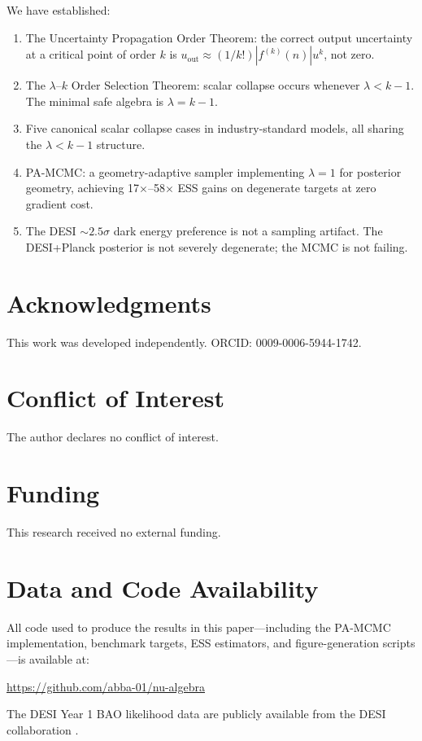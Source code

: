 \documentclass[11pt]{article}
\theoremstyle{definition}
\begin{document}
We have established:
\begin{enumerate}
\item The Uncertainty Propagation Order Theorem: the correct output uncertainty at a
  critical point of order $k$ is $u_{\mathrm{out}} \approx (1/k!)|f^{(k)}(n)|u^k$,
  not zero.
\item The $\lambda$--$k$ Order Selection Theorem: scalar collapse occurs whenever
  $\lambda < k-1$.  The minimal safe algebra is $\lambda = k-1$.
\item Five canonical scalar collapse cases in industry-standard models, all sharing
  the $\lambda < k-1$ structure.
\item PA-MCMC: a geometry-adaptive sampler implementing $\lambda=1$ for posterior
  geometry, achieving 17$\times$--58$\times$ ESS gains on degenerate targets at
  zero gradient cost.
\item The DESI ${\sim}2.5\sigma$ dark energy preference is not a sampling artifact.
  The DESI+Planck posterior is not severely degenerate; the MCMC is not failing.
\end{enumerate}

\section*{Acknowledgments}
This work was developed independently.
ORCID: 0009-0006-5944-1742.

\section*{Conflict of Interest}
The author declares no conflict of interest.

\section*{Funding}
This research received no external funding.

\section*{Data and Code Availability}
All code used to produce the results in this paper—including the PA-MCMC
implementation, benchmark targets, ESS estimators, and figure-generation
scripts—is available at:
\begin{center}
\url{https://github.com/abba-01/nu-algebra}
\end{center}
The DESI Year 1 BAO likelihood data are publicly available from the DESI
collaboration \citep{desi2024bao}.



\end{document}
